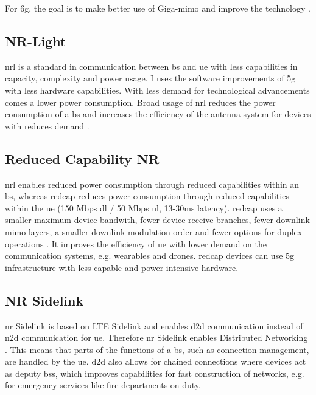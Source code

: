 \documentclass[11pt,a4paper]{article}
\begin{document}
For \acrshort{6g}, the goal is to make better use of Giga-\acrshort{mimo} and improve the technology \citep{3gpp17}.

\subsection{NR-Light}\label{subsec:nrlight}
\acrfull{nrl} is a standard in communication between \acrshort{bs} and \acrshort{ue} with less capabilities in capacity, complexity and power usage.
I uses the software improvements of \acrshort{5g} with less hardware capabilities.
With less demand for technological advancements comes a lower power consumption.
Broad usage of \acrshort{nrl} reduces the power consumption of a \acrlong{bs} and increases the efficiency of the antenna system for devices with reduces demand \citep{3gpp17}.

\subsection{Reduced Capability NR}\label{subsec:RedCap}
\acrshort{nrl} enables reduced power consumption through reduced capabilities within an \acrshort{bs}, whereas \acrfull{redcap} reduces power consumption through reduced capabilities within the \acrshort{ue} (150 Mbps \acrshort{dl} / 50 Mbps \acrshort{ul}, 13-30ms latency).
\acrshort{redcap} uses a smaller maximum device bandwith, fewer device receive branches, fewer downlink \acrshort{mimo} layers, a smaller downlink modulation order and fewer options for duplex operations \citep{3gpp17}.
It improves the efficiency of \acrshort{ue} with lower demand on the communication systems, e.g. wearables and drones.
\acrshort{redcap} devices can use \acrshort{5g} infrastructure with less capable and power-intensive hardware. 

\subsection{NR Sidelink}\label{subsec:sidelink}
\acrshort{nr} Sidelink is based on LTE Sidelink and enables \acrfull{d2d} communication instead of \acrfull{n2d} communication for \acrshort{ue}.
Therefore \acrshort{nr} Sidelink enables Distributed Networking \citep{3gpp17}.
This means that parts of the functions of a \acrshort{bs}, such as connection management, are handled by the \acrshort{ue}.
\acrlong{d2d} also allows for chained connections where devices act as deputy \acrlong{bs}s, which improves capabilities for fast construction of networks, e.g. for emergency services like fire departments on duty.
\end{document}

